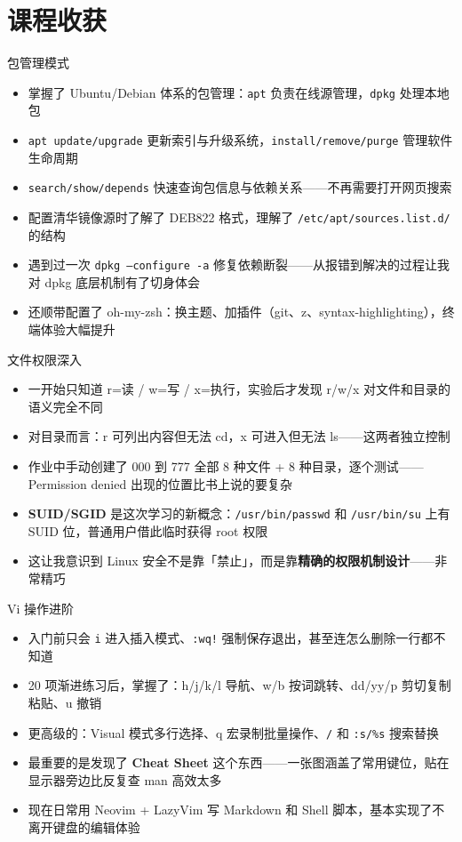 \section{课程收获}

\begin{frame}{包管理模式}
\begin{itemize}
  \item 掌握了 Ubuntu/Debian 体系的包管理：\texttt{apt} 负责在线源管理，\texttt{dpkg} 处理本地包
  \item \texttt{apt update/upgrade} 更新索引与升级系统，\texttt{install/remove/purge} 管理软件生命周期
  \item \texttt{search/show/depends} 快速查询包信息与依赖关系——不再需要打开网页搜索
  \item 配置清华镜像源时了解了 DEB822 格式，理解了 \texttt{/etc/apt/sources.list.d/} 的结构
  \item 遇到过一次 \texttt{dpkg --configure -a} 修复依赖断裂——从报错到解决的过程让我对 dpkg 底层机制有了切身体会
  \item 还顺带配置了 oh-my-zsh：换主题、加插件（git、z、syntax-highlighting），终端体验大幅提升
\end{itemize}
\end{frame}

\begin{frame}{文件权限深入}
\begin{itemize}
  \item 一开始只知道 r=读 / w=写 / x=执行，实验后才发现 r/w/x 对文件和目录的语义完全不同
  \item 对目录而言：r 可列出内容但无法 cd，x 可进入但无法 ls——这两者独立控制
  \item 作业中手动创建了 000 到 777 全部 8 种文件 + 8 种目录，逐个测试——Permission denied 出现的位置比书上说的要复杂
  \item \textbf{SUID/SGID} 是这次学习的新概念：\texttt{/usr/bin/passwd} 和 \texttt{/usr/bin/su} 上有 SUID 位，普通用户借此临时获得 root 权限
  \item 这让我意识到 Linux 安全不是靠「禁止」，而是靠\textbf{精确的权限机制设计}——非常精巧
\end{itemize}
\end{frame}

\begin{frame}{Vi 操作进阶}
\begin{itemize}
  \item 入门前只会 \texttt{i} 进入插入模式、\texttt{:wq!} 强制保存退出，甚至连怎么删除一行都不知道
  \item 20 项渐进练习后，掌握了：h/j/k/l 导航、w/b 按词跳转、dd/yy/p 剪切复制粘贴、u 撤销
  \item 更高级的：Visual 模式多行选择、q 宏录制批量操作、\texttt{/} 和 \texttt{:s/\%s} 搜索替换
  \item 最重要的是发现了 \textbf{Cheat Sheet} 这个东西——一张图涵盖了常用键位，贴在显示器旁边比反复查 man 高效太多
  \item 现在日常用 Neovim + LazyVim 写 Markdown 和 Shell 脚本，基本实现了不离开键盘的编辑体验
\end{itemize}
\end{frame}

